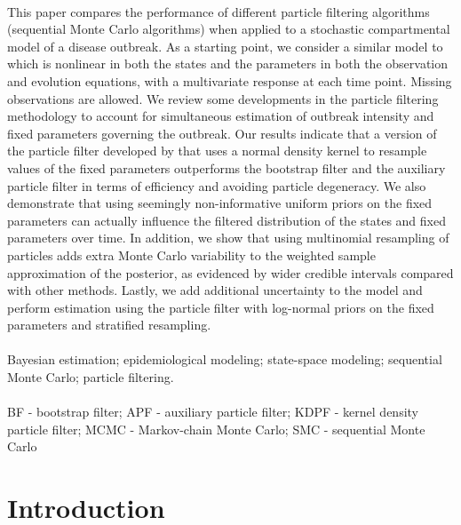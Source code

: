 \documentclass{elsarticle}
\begin{document}
 \\

This paper compares the performance of different particle filtering algorithms (sequential Monte Carlo algorithms) when applied to a stochastic compartmental model of a disease outbreak. As a starting point, we consider a similar model to \citet{skvortsov2012monitoring} which is nonlinear in both the states and the parameters in both the observation and evolution equations, with a multivariate response at each time point. Missing observations are allowed. We review some developments in the particle filtering methodology to account for simultaneous estimation of outbreak intensity and fixed parameters governing the outbreak. Our results indicate that a version of the particle filter developed by \citet{Liu:West:comb:2001} that uses a normal density kernel to resample values of the fixed parameters outperforms the bootstrap filter and the auxiliary particle filter in terms of efficiency and avoiding particle degeneracy. We also demonstrate that using seemingly non-informative uniform priors on the fixed parameters can actually influence the filtered distribution of the states and fixed parameters over time. In addition, we show that using multinomial resampling of particles adds extra Monte Carlo variability to the weighted sample approximation of the posterior, as evidenced by wider credible intervals compared with other methods.  Lastly, we add additional uncertainty to the model and perform estimation using the \citet{Liu:West:comb:2001} particle filter with log-normal priors on the fixed parameters and stratified resampling. \\

 \\

Bayesian estimation; epidemiological modeling; state-space modeling; sequential Monte Carlo; particle filtering. \\

 \\

BF - bootstrap filter; APF - auxiliary particle filter; KDPF - kernel density particle filter; MCMC - Markov-chain Monte Carlo; SMC - sequential Monte Carlo

\section{Introduction} \label{sec:intro}
\end{document}
